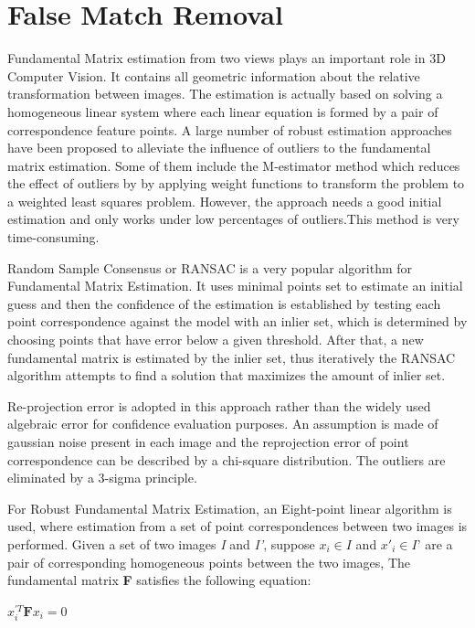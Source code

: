 \section{False Match Removal} 

Fundamental Matrix estimation from two views plays an important role in 3D Computer Vision. It contains all geometric information about the relative transformation between images. The estimation is actually based on solving a homogeneous linear system where each linear equation is formed by a pair of correspondence feature points. A large number of robust estimation approaches have been proposed to alleviate the influence of outliers to the fundamental matrix estimation. Some of them include the M-estimator method which reduces the effect of outliers by by applying weight functions to transform the problem to a weighted least squares problem. However, the approach needs a good initial estimation and only works under low percentages of outliers.This method is very time-consuming.

Random Sample Consensus or RANSAC \cite{RANSAC}\cite{optimalransac} is a very popular algorithm for Fundamental Matrix Estimation. It uses minimal points set to estimate an initial guess and then the confidence of the estimation is established by testing each point correspondence against the model with an inlier set, which is determined by choosing points that have error below a given threshold. After that, a new fundamental matrix is estimated by the inlier set, thus iteratively the RANSAC algorithm attempts to find a solution that maximizes the amount of inlier set.

Re-projection error is adopted in this approach\cite{ming} rather than the widely used algebraic error for confidence evaluation purposes.  An assumption is made of gaussian noise present in each image and the reprojection error of point correspondence can be described by a chi-square distribution. The outliers are eliminated by a 3-sigma principle.

For Robust Fundamental Matrix Estimation, an Eight-point linear algorithm is used, where  estimation from a set of point correspondences between two images is performed. Given a set of two images \textit{I} and \textit{I'}, suppose $x_i \in \textit{I}$ and $x'_{i} \in \textit{I'} $ are a pair of corresponding homogeneous points between the two images, The fundamental matrix \textbf{F} satisfies the following equation:

\begin{center}
	$x^{'T}_i \textbf{F} x_i  = 0$
\end{center}

